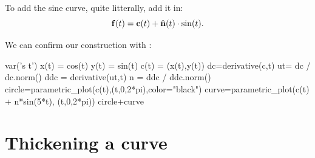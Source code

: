 \documentclass{ximera}
\begin{document}
\begin{example}
\begin{explanation}
\begin{image}
\end{image}
To add the sine curve, quite litterally, add it in:
\[
\mathbf{f}(t) = \mathbf{c}(t) + \mathbf{\hat{n}}(t)\cdot \sin(t).
\]
\begin{onlineOnly}
We can confirm our construction with \sage: 
\begin{sageCell}
var('s t')
x(t) = cos(t)
y(t) = sin(t)
c(t) = (x(t),y(t))
dc=derivative(c,t)
ut= dc / dc.norm()
ddc = derivative(ut,t)
n = ddc / ddc.norm()
circle=parametric_plot(c(t),(t,0,2*pi),color="black")
curve=parametric_plot(c(t) + n*sin(5*t), (t,0,2*pi))
circle+curve
\end{sageCell}
\end{onlineOnly}
  \end{explanation}
\end{example}

\section{Thickening a curve}
\end{document}

